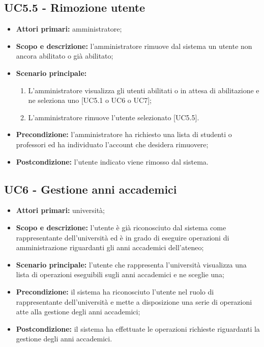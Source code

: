 \documentclass[AnalisiDeiRequisiti.tex]{subfiles}
\begin{document}
\subsection{UC5.5 - Rimozione utente}
\begin{itemize}
	\item \textbf{Attori primari:} amministratore;
	\item \textbf{Scopo e descrizione:} l'amministratore rimuove dal sistema un utente non ancora abilitato o già abilitato;
	\item \textbf{Scenario principale:}
	\begin{enumerate}
		\item L'amministratore visualizza gli utenti abilitati o in attesa di abilitazione e ne seleziona uno [UC5.1 o UC6 o UC7];
		\item L'amministratore rimuove l'utente selezionato [UC5.5].
	\end{enumerate}
	\item \textbf{Precondizione:} l'amministratore ha richiesto una lista di studenti o professori ed ha individuato l'account che desidera rimuovere;
	\item \textbf{Postcondizione:} l'utente indicato viene rimosso dal sistema.
\end{itemize}
\subsection{UC6 - Gestione anni accademici}
\begin{itemize}
	\item \textbf{Attori primari:} università;
	\item \textbf{Scopo e descrizione:} l'utente è già riconosciuto dal sistema come rappresentante dell'università ed è in grado di eseguire operazioni di amministrazione riguardanti gli anni accademici dell'ateneo;
	\item \textbf{Scenario principale:} l'utente che rappresenta l'università visualizza una lista di operazioni eseguibili sugli anni accademici e ne sceglie una;
	\item \textbf{Precondizione:} il sistema ha riconosciuto l'utente nel ruolo di rappresentante dell'università e mette a disposizione una serie di operazioni atte alla gestione degli anni accademici; 
	\item \textbf{Postcondizione:} il sistema ha effettuate le operazioni richieste riguardanti la gestione degli anni accademici.
\end{itemize}
\end{document}
